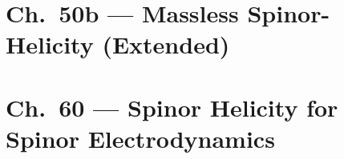 \documentclass[12pt]{report}
\theoremstyle{remark}
\begin{document}
\chapter{Ch.\ 50b --- Massless Spinor-Helicity (Extended)}


\chapter{Ch.\ 60 --- Spinor Helicity for Spinor Electrodynamics}

\end{document}

